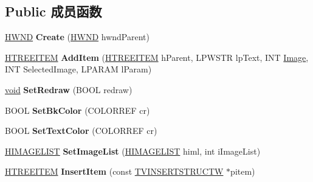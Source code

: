 \subsection*{Public 成员函数}
\begin{DoxyCompactItemize}
\item 
\mbox{\label{class_c_tree_view_a8b45afb71532495094d94ae5b4fafa95}} 
\hyperlink{interfacevoid}{H\+W\+ND} {\bfseries Create} (\hyperlink{interfacevoid}{H\+W\+ND} hwnd\+Parent)
\item 
\mbox{\label{class_c_tree_view_ac7f6a840233c76657f4dd885ea8f712f}} 
\hyperlink{struct___t_r_e_e_i_t_e_m}{H\+T\+R\+E\+E\+I\+T\+EM} {\bfseries Add\+Item} (\hyperlink{struct___t_r_e_e_i_t_e_m}{H\+T\+R\+E\+E\+I\+T\+EM} h\+Parent, L\+P\+W\+S\+TR lp\+Text, I\+NT \hyperlink{class_image}{Image}, I\+NT Selected\+Image, L\+P\+A\+R\+AM l\+Param)
\item 
\mbox{\label{class_c_tree_view_adc481e33cebe050e2ecc402683ad1fbb}} 
\hyperlink{interfacevoid}{void} {\bfseries Set\+Redraw} (B\+O\+OL redraw)
\item 
\mbox{\label{class_c_tree_view_ae5ec2119d0a25a6ee0938d402edd5fa2}} 
B\+O\+OL {\bfseries Set\+Bk\+Color} (C\+O\+L\+O\+R\+R\+EF cr)
\item 
\mbox{\label{class_c_tree_view_afeba705769df1131b60eee90969d3ef6}} 
B\+O\+OL {\bfseries Set\+Text\+Color} (C\+O\+L\+O\+R\+R\+EF cr)
\item 
\mbox{\label{class_c_tree_view_a3611cb11b8572cce3e9e98236f182dcd}} 
\hyperlink{struct___i_m_a_g_e_l_i_s_t}{H\+I\+M\+A\+G\+E\+L\+I\+ST} {\bfseries Set\+Image\+List} (\hyperlink{struct___i_m_a_g_e_l_i_s_t}{H\+I\+M\+A\+G\+E\+L\+I\+ST} himl, int i\+Image\+List)
\item 
\mbox{\label{class_c_tree_view_af5fdf5df3a7faa5e4aa4ca1297216399}} 
\hyperlink{struct___t_r_e_e_i_t_e_m}{H\+T\+R\+E\+E\+I\+T\+EM} {\bfseries Insert\+Item} (const \hyperlink{structtag_t_v_i_n_s_e_r_t_s_t_r_u_c_t_w}{T\+V\+I\+N\+S\+E\+R\+T\+S\+T\+R\+U\+C\+TW} $\ast$pitem)
\item 
\mbox{\label{class_c_tree_view_a5bd33cbe746f50b7a3dd4dde9ceee6eb}} 

\end{DoxyCompactItemize}
